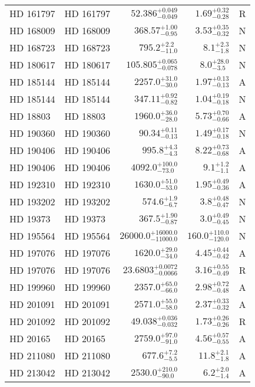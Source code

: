 \begin{longtable*}{llrrr}
HD 161797 & HD 161797 & $52.386^{+0.049}_{-0.049}$ & $1.69^{+0.32}_{-0.28}$ & R \\ 
HD 168009 & HD 168009 & $368.57^{+1.00}_{-0.95}$ & $3.53^{+0.35}_{-0.32}$ & N \\ 
HD 168723 & HD 168723 & $795.2^{+2.2}_{-11.0}$ & $8.1^{+2.3}_{-1.8}$ & N \\ 
HD 180617 & HD 180617 & $105.805^{+0.065}_{-0.078}$ & $8.0^{+28.0}_{-3.5}$ & N \\ 
HD 185144 & HD 185144 & $2257.0^{+31.0}_{-30.0}$ & $1.97^{+0.13}_{-0.13}$ & A \\ 
HD 185144 & HD 185144 & $347.11^{+0.92}_{-0.82}$ & $1.04^{+0.19}_{-0.18}$ & N \\ 
HD 18803 & HD 18803 & $1960.0^{+36.0}_{-28.0}$ & $5.73^{+0.70}_{-0.66}$ & A \\ 
HD 190360 & HD 190360 & $90.34^{+0.11}_{-0.13}$ & $1.49^{+0.17}_{-0.18}$ & N \\ 
HD 190406 & HD 190406 & $995.8^{+4.3}_{-4.3}$ & $8.22^{+0.73}_{-0.68}$ & A \\ 
HD 190406 & HD 190406 & $4092.0^{+100.0}_{-73.0}$ & $9.1^{+1.2}_{-1.1}$ & A \\ 
HD 192310 & HD 192310 & $1630.0^{+51.0}_{-53.0}$ & $1.95^{+0.49}_{-0.36}$ & A \\ 
HD 193202 & HD 193202 & $574.6^{+1.9}_{-6.7}$ & $3.8^{+0.48}_{-0.47}$ & N \\ 
HD 19373 & HD 19373 & $367.5^{+1.90}_{-0.87}$ & $3.0^{+0.49}_{-0.45}$ & N \\ 
HD 195564 & HD 195564 & $26000.0^{+16000.0}_{-11000.0}$ & $160.0^{+110.0}_{-120.0}$ & N \\ 
HD 197076 & HD 197076 & $1620.0^{+29.0}_{-34.0}$ & $4.45^{+0.44}_{-0.42}$ & A \\ 
HD 197076 & HD 197076 & $23.6803^{+0.0072}_{-0.0066}$ & $3.16^{+0.55}_{-0.49}$ & R \\ 
HD 199960 & HD 199960 & $2357.0^{+65.0}_{-66.0}$ & $2.98^{+0.72}_{-0.48}$ & A \\ 
HD 201091 & HD 201091 & $2571.0^{+55.0}_{-58.0}$ & $2.37^{+0.33}_{-0.32}$ & A \\ 
HD 201092 & HD 201092 & $49.038^{+0.036}_{-0.032}$ & $1.73^{+0.26}_{-0.26}$ & R \\ 
HD 20165 & HD 20165 & $2759.0^{+97.0}_{-91.0}$ & $4.56^{+0.57}_{-0.55}$ & A \\ 
HD 211080 & HD 211080 & $677.6^{+7.2}_{-5.5}$ & $11.8^{+2.1}_{-1.8}$ & A \\ 
HD 213042 & HD 213042 & $2530.0^{+210.0}_{-90.0}$ & $6.2^{+2.0}_{-1.4}$ & A \\ 

\end{longtable*}
